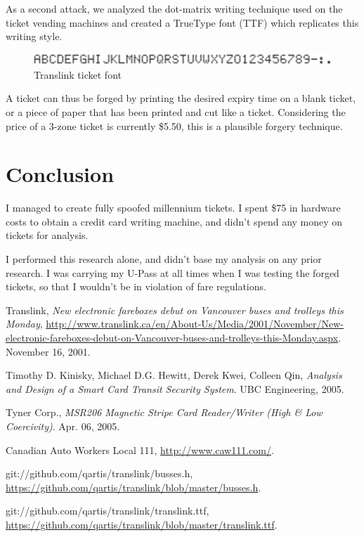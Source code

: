 \documentclass[fontsize=12pt]{scrartcl}
\begin{document}
As a second attack, we analyzed the dot-matrix writing technique used on the ticket vending machines and created a TrueType font (TTF) which replicates this writing style.

\begin{figure}[ht!]
\centering
\includegraphics[width=120mm]{font.png}
\caption{Translink ticket font \cite{ttf}}
\end{figure}

A ticket can thus be forged by printing the desired expiry time on a blank ticket, or a piece of paper that has been printed and cut like a ticket. Considering the price of a 3-zone ticket is currently \$5.50, this is a plausible forgery technique.

\section{Conclusion}
I managed to create fully spoofed millennium tickets. I spent \$75 in hardware costs to obtain a credit card writing machine, and didn't spend any money on tickets for analysis.

I performed this research alone, and didn't base my analysis on any prior research. I was carrying my U-Pass at all times when I was testing the forged tickets, so that I wouldn't be in violation of fare regulations.


\begin{thebibliography}{9}

  Translink,
  \emph{New electronic fareboxes debut on Vancouver buses and trolleys this Monday},
  \url{http://www.translink.ca/en/About-Us/Media/2001/November/New-electronic-fareboxes-debut-on-Vancouver-buses-and-trolleys-this-Monday.aspx}.
  November 16, 2001.
  
  Timothy D. Kinisky, Michael D.G. Hewitt, Derek Kwei, Colleen Qin, 
  \emph{Analysis and Design of a Smart Card Transit Security System}.
  UBC Engineering,
  2005.

  Tyner Corp.,
  \emph{MSR206 Magnetic Stripe Card Reader/Writer (High \& Low Coercivity)}.
  Apr. 06, 2005.
  
  Canadian Auto Workers Local 111, 
  \url{http://www.caw111.com/}.
  
  git://github.com/qartis/translink/busses.h,
  \url{https://github.com/qartis/translink/blob/master/busses.h}.

  
  git://github.com/qartis/translink/translink.ttf,
  \url{https://github.com/qartis/translink/blob/master/translink.ttf}.

\end{thebibliography}
\end{document}
